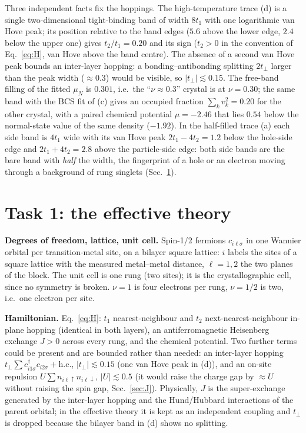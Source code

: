 \documentclass[11pt]{article}
\newcommand{\nuh}{\nu=1/2}
\begin{document}
Three independent facts fix the hoppings. The high-temperature trace (d) is a single two-dimensional tight-binding band of width $8t_1$ with one logarithmic van Hove peak; its position relative to the band edges ($5.6$ above the lower edge, $2.4$ below the upper one) gives $t_2/t_1=0.20$ and its sign ($t_2>0$ in the convention of Eq.~\ref{eq:H}, van Hove above the band centre). The absence of a second van Hove peak bounds an inter-layer hopping: a bonding--antibonding splitting $2t_\perp$ larger than the peak width ($\approx0.3$) would be visible, so $|t_\perp|\lesssim0.15$. The free-band filling of the fitted $\mu_N$ is $0.301$, i.e.\ the ``$\nu\approx0.3$'' crystal is at $\nu=0.30$; the same band with the BCS fit of (c) gives an occupied fraction $\sum_kv_k^2=0.20$ for the other crystal, with a paired chemical potential $\mu=-2.46$ that lies $0.54$ below the normal-state value of the same density ($-1.92$). In the half-filled trace (a) each side band is $4t_1$ wide with its van Hove peak $2t_1-4t_2=1.2$ below the hole-side edge and $2t_1+4t_2=2.8$ above the particle-side edge: both side bands are the bare band with \emph{half} the width, the fingerprint of a hole or an electron moving through a background of rung singlets (Sec.~\ref{sec:theory}).

\section{Task 1: the effective theory}\label{sec:theory}

\textbf{Degrees of freedom, lattice, unit cell.} Spin-1/2 fermions $c_{i\ell\sigma}$ in one Wannier orbital per transition-metal site, on a bilayer square lattice: $i$ labels the sites of a square lattice with the measured metal--metal distance, $\ell=1,2$ the two planes of the block. The unit cell is one rung (two sites); it is the crystallographic cell, since no symmetry is broken. $\nu=1$ is four electrons per rung, $\nuh$ is two, i.e.\ one electron per site.

\textbf{Hamiltonian.} Eq.~\eqref{eq:H}: $t_1$ nearest-neighbour and $t_2$ next-nearest-neighbour in-plane hopping (identical in both layers), an antiferromagnetic Heisenberg exchange $J>0$ across every rung, and the chemical potential. Two further terms could be present and are bounded rather than needed: an inter-layer hopping $t_\perp\sum c^\dagger_{i1\sigma}c_{i2\sigma}+\text{h.c.}$, $|t_\perp|\lesssim0.15$ (one van Hove peak in (d)), and an on-site repulsion $U\sum n_{i\ell\uparrow}n_{i\ell\downarrow}$, $|U|\lesssim0.5$ (it would raise the charge gap by $\approx U$ without raising the spin gap, Sec.~\ref{sec:J}). Physically, $J$ is the super-exchange generated by the inter-layer hopping and the Hund/Hubbard interactions of the parent orbital; in the effective theory it is kept as an independent coupling and $t_\perp$ is dropped because the bilayer band in (d) shows no splitting.
\end{document}
